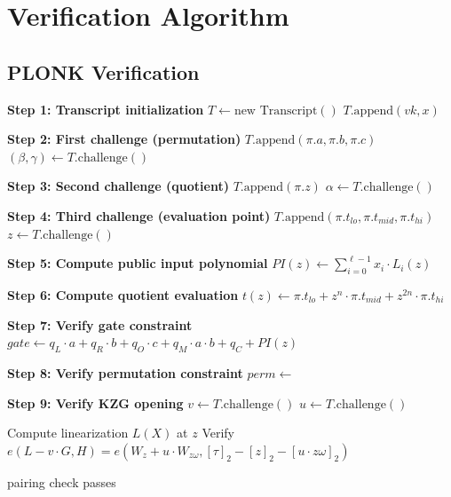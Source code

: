 \documentclass[11pt,a4paper]{article}
\theoremstyle{definition}
\begin{document}
\section{Verification Algorithm}

\subsection{PLONK Verification}

\begin{algorithm}
\caption{PLONK Verification}
\begin{algorithmic}[1]
    \State \textbf{Step 1: Transcript initialization}
    \State $T \gets \text{new Transcript}()$
    \State $T.\text{append}(vk, x)$

    \State \textbf{Step 2: First challenge (permutation)}
    \State $T.\text{append}(\pi.a, \pi.b, \pi.c)$
    \State $(\beta, \gamma) \gets T.\text{challenge}()$

    \State \textbf{Step 3: Second challenge (quotient)}
    \State $T.\text{append}(\pi.z)$
    \State $\alpha \gets T.\text{challenge}()$

    \State \textbf{Step 4: Third challenge (evaluation point)}
    \State $T.\text{append}(\pi.t_{lo}, \pi.t_{mid}, \pi.t_{hi})$
    \State $z \gets T.\text{challenge}()$

    \State \textbf{Step 5: Compute public input polynomial}
    \State $PI(z) \gets \sum_{i=0}^{\ell-1} x_i \cdot L_i(z)$

    \State \textbf{Step 6: Compute quotient evaluation}
    \State $t(z) \gets \pi.t_{lo} + z^n \cdot \pi.t_{mid} + z^{2n} \cdot \pi.t_{hi}$

    \State \textbf{Step 7: Verify gate constraint}
    \State $gate \gets q_L \cdot a + q_R \cdot b + q_O \cdot c + q_M \cdot a \cdot b + q_C + PI(z)$

    \State \textbf{Step 8: Verify permutation constraint}
    \State $perm \gets$ 

    \State \textbf{Step 9: Verify KZG opening}
    \State $v \gets T.\text{challenge}()$
    \State $u \gets T.\text{challenge}()$

    \State Compute linearization $L(X)$ at $z$
    \State Verify $e(L - v \cdot G, H) = e(W_z + u \cdot W_{z\omega}, [\tau]_2 - [z]_2 - [u \cdot z\omega]_2)$

    \State \Return pairing check passes
\EndFunction
\end{algorithmic}
\end{algorithm}
\end{document}
